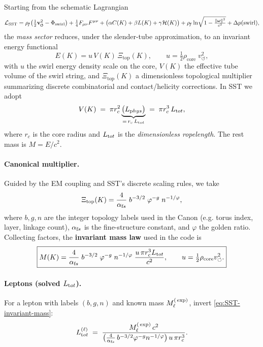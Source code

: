 \documentclass[11pt]{article}
\begin{document}
Starting from the schematic Lagrangian
\[
    \mathcal{L}_{\text{SST}}
    = \rhof\!\left(\tfrac{1}{2}\vswirl^2 - \Phi_{\text{swirl}}\right)
    + \tfrac{1}{4}F_{\mu\nu}F^{\mu\nu}
    + \big(\alpha C(K)+\beta L(K)+\gamma \mathcal{H}(K)\big)
    + \rhof \ln\!\sqrt{1-\tfrac{\|\boldsymbol\omega\|^2}{c^2}}
    + \Delta p(\text{swirl}),
\]
the \emph{mass sector} reduces, under the slender-tube approximation, to an invariant energy functional
\[
    E(K)= u\,V(K)\,\Xi_{\text{top}}(K),\qquad
    u=\tfrac{1}{2}\rho_{\text{core}}\;v_{\circlearrowleft}^{2},
\]
with $u$ the swirl energy density scale on the core, $V(K)$ the effective tube volume of the swirl string, and $\Xi_{\text{top}}(K)$ a dimensionless topological multiplier summarizing discrete combinatorial and contact/helicity corrections. In SST we adopt
\[
    V(K)\;=\;\pi r_c^2 \underbrace{\big(L_{\textrm phys}\big)}_{=\,r_c\,L_{\textrm tot}}
    \;=\;\pi r_c^3\,L_{\textrm tot},
\]
where $r_c$ is the core radius and $L_{\textrm tot}$ is the \emph{dimensionless ropelength}. The rest mass is $M=E/c^2$.

\paragraph{Canonical multiplier.}
    Guided by the EM coupling and SST’s discrete scaling rules, we take
    \[
        \Xi_{\text{top}}(K)=\frac{4}{\alpha_{\textrm fs}}\;b^{-3/2}\;\varphi^{-g}\;n^{-1/\varphi},
    \]
    where $b,g,n$ are the integer topology labels used in the Canon (e.g. torus index, layer, linkage count), $\alpha_{\textrm fs}$ is the fine-structure constant, and $\varphi$ the golden ratio. Collecting factors, the \textbf{invariant mass law} used in the code is
    \begin{equation*}
    \boxed{M(K)=\frac{4}{\alpha_{\textrm fs}}\;b^{-3/2}\;\varphi^{-g}\;n^{-1/\varphi}\;
    \frac{u\,\pi r_c^3 L_{\textrm tot}}{c^2},
        \qquad
        u=\tfrac{1}{2}\rho_{\text{core}}v_{\circlearrowleft}^2.
    }\label{eq:SST-invariant-mass}
    \end{equation*}

\paragraph{Leptons (solved $L_{\textrm tot}$).}
    For a lepton with labels $(b,g,n)$ and known mass $M_\ell^{\textrm(\exp)}$, invert \eqref{eq:SST-invariant-mass}:
    \[
        L_{\textrm tot}^{(\ell)} \;=\;
        \frac{M_\ell^{\textrm(\exp)}\,c^2}{\big(\tfrac{4}{\alpha_{\textrm fs}}\,b^{-3/2}\varphi^{-g}n^{-1/\varphi}\big)\,u\,\pi r_c^3}.
    \]
\end{document}

